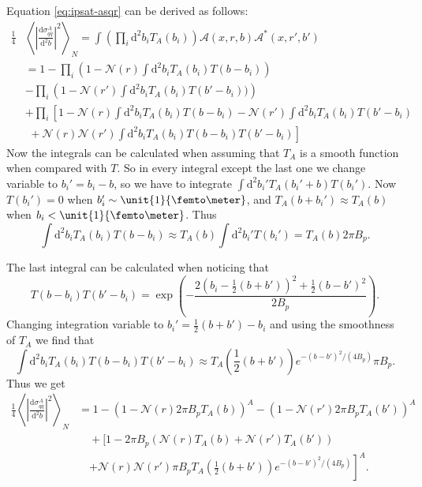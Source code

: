 \documentclass[a4paper,12pt]{article}
\newcommand{\der}{\mathrm{d}}
\newcommand{\A}{\mathcal{A}}
\newcommand{\N}{\mathcal{N}}
\begin{document}
Equation \eqref{eq:ipsat-asqr} can be derived as follows:
\begin{align*}
	\frac{1}{4}&\left \langle \left| \frac{\der \sigma_{q\bar q}^A}{\der^2 b} \right|^2 \right \rangle_N = \int \left(\prod_i \der^2 b_i T_A(b_i) \right) \A(x,r,b) \A^*(x,r',b') \\
	& = 1 - \prod_i \left(1 - \N(r) \int \der^2 b_i T_A(b_i) T(b-b_i) \right) \\
	& - \prod_i \left(1- \N(r') \int \der^2 b_i T_A(b_i) T(b'-b_i)) \right) \\
	& + \prod_i \left[ 1 - \N(r) \int \der^2 b_i T_A(b_i) T(b-b_i) - \N(r')\int \der^2 b_i T_A(b_i)T(b'-b_i)  \right. \\
	&\left. \,\, + \N(r)\N(r')\int \der^2 b_i T_A(b_i) T(b-b_i)T(b'-b_i) \right]
\end{align*}
Now the integrals can be calculated when assuming that $T_A$ is a smooth function when compared with $T$. So in every integral except the last one we change variable to $b_i'=b_i-b$, so we have to integrate $\int \der^2 b_i' T_A(b_i'+b) T(b_i')$. Now $T(b_i')=0$ when $b_i' \sim \unit{1}{\femto\meter}$, and $T_A(b+b_i')\approx T_A(b)$ when $b_i < \unit{1}{\femto\meter}$. Thus 
\begin{equation}
	\int \der^2 b_i T_A(b_i)T(b-b_i) \approx T_A(b) \int \der^2 b_i' T(b_i') = T_A(b)2\pi B_p.
\end{equation}

The last integral can be calculated when noticing that
\begin{equation}
	T(b-b_i)T(b'-b_i) = \exp\left( - \frac{2(b_i - \frac{1}{2}(b+b'))^2 + \frac{1}{2}(b-b')^2}{2B_p} \right).
\end{equation}
Changing integration variable to $b_i' = \frac{1}{2}(b+b')-b_i$ and using the smoothness of $T_A$ we find that
\begin{equation}
	\int \der^2 b_i T_A(b_i)T(b-b_i)T(b'-b_i) \approx T_A\left( \frac{1}{2}(b+b') \right) e^{-(b-b')^2/(4B_p)} \pi B_p.
\end{equation}
Thus we get
\begin{equation}
\begin{split}
	\frac{1}{4}\left \langle \left| \frac{\der \sigma_{q\bar q}^A}{\der^2 b} \right|^2 \right \rangle_N &= 1 - \left(1-\N(r)2\pi B_p T_A(b)\right)^A - \left(1-\N(r')2\pi B_p T_A(b') \right)^A \\
	&\quad +  \bigg[ 1 - 2\pi B_p(\N(r)T_A(b)+\N(r')T_A(b'))  \\
	&\quad \left. + \N(r)\N(r')\pi B_p T_A\left(\frac{1}{2}(b+b')\right) e^{-(b-b')^2/(4B_p)} \right]^A.
\end{split}
\end{equation}
\end{document}
